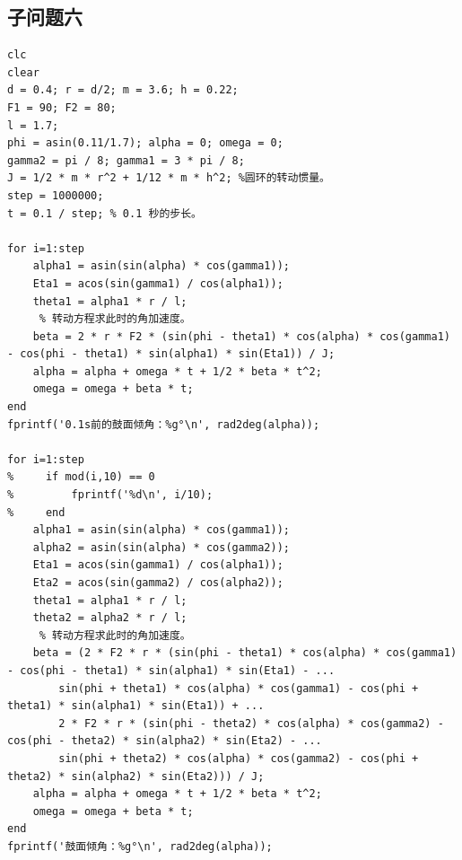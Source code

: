 \documentclass{cumcm}
\begin{document}
\subsection{子问题六}
\begin{lstlisting}
clc
clear
d = 0.4; r = d/2; m = 3.6; h = 0.22;
F1 = 90; F2 = 80;
l = 1.7;
phi = asin(0.11/1.7); alpha = 0; omega = 0;
gamma2 = pi / 8; gamma1 = 3 * pi / 8;
J = 1/2 * m * r^2 + 1/12 * m * h^2; %圆环的转动惯量。
step = 1000000;
t = 0.1 / step; % 0.1 秒的步长。

for i=1:step
    alpha1 = asin(sin(alpha) * cos(gamma1));
    Eta1 = acos(sin(gamma1) / cos(alpha1));
    theta1 = alpha1 * r / l;
     % 转动方程求此时的角加速度。
    beta = 2 * r * F2 * (sin(phi - theta1) * cos(alpha) * cos(gamma1) - cos(phi - theta1) * sin(alpha1) * sin(Eta1)) / J;
    alpha = alpha + omega * t + 1/2 * beta * t^2;
    omega = omega + beta * t;
end
fprintf('0.1s前的鼓面倾角：%g°\n', rad2deg(alpha));

for i=1:step
%     if mod(i,10) == 0
%         fprintf('%d\n', i/10);
%     end
    alpha1 = asin(sin(alpha) * cos(gamma1));
    alpha2 = asin(sin(alpha) * cos(gamma2));
    Eta1 = acos(sin(gamma1) / cos(alpha1));
    Eta2 = acos(sin(gamma2) / cos(alpha2));
    theta1 = alpha1 * r / l;
    theta2 = alpha2 * r / l;
     % 转动方程求此时的角加速度。
    beta = (2 * F2 * r * (sin(phi - theta1) * cos(alpha) * cos(gamma1) - cos(phi - theta1) * sin(alpha1) * sin(Eta1) - ...
        sin(phi + theta1) * cos(alpha) * cos(gamma1) - cos(phi + theta1) * sin(alpha1) * sin(Eta1)) + ...
        2 * F2 * r * (sin(phi - theta2) * cos(alpha) * cos(gamma2) - cos(phi - theta2) * sin(alpha2) * sin(Eta2) - ...
        sin(phi + theta2) * cos(alpha) * cos(gamma2) - cos(phi + theta2) * sin(alpha2) * sin(Eta2))) / J;
    alpha = alpha + omega * t + 1/2 * beta * t^2;
    omega = omega + beta * t;
end
fprintf('鼓面倾角：%g°\n', rad2deg(alpha));
\end{lstlisting}
\end{document}
